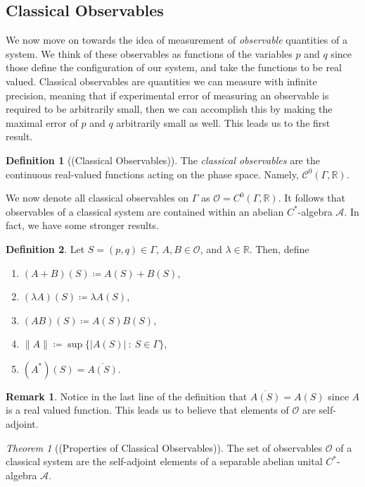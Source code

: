 \documentclass[leqno]{article}
\theoremstyle{definition}
\newtheorem{definition}{Definition}[section]
\newtheorem*{remark}{Remark}
\theoremstyle{remark}
\theoremstyle{theorem}
\newtheorem{theorem}{Theorem}[section]
\newcommand{\R}{\mathbb{R}}
\newcommand{\A}{\mathcal{A}}
\newcommand{\opO}{\mathcal{O}}
\begin{document}
\subsection{Classical Observables}
We now move on towards the idea of measurement of \emph{observable} quantities of a system. We think of these observables as functions of the variables $p$ and $q$ since those define the configuration of our system, and take the functions to be real valued.  Classical observables are quantities we can measure with infinite precision, meaning that if experimental error of measuring an observable is required to be arbitrarily small, then we can accomplish this by making the maximal error of $p$ and $q$ arbitrarily small as well.  This leads us to the first result.

\begin{definition}[(Classical Observables)]
The \emph{classical observables} are the continuous real-valued functions acting on the phase space.   Namely, $\mathcal{C}^0(\Gamma,\R)$.
\end{definition}

We now denote all classical observables on $\Gamma$ as $\opO=C^0(\Gamma,\R)$.  It follows that observables of a classical system are contained within an abelian $C^*$-algebra $\A$. In fact, we have some stronger results.

\begin{definition}
Let $S=(p,q)\in \Gamma$, $A,B\in \opO$, and $\lambda\in \R$. Then, define
\begin{enumerate}[1.]
\item $(A+B)(S)\coloneqq A(S)+B(S)$,
\item $(\lambda A)(S)\coloneqq \lambda A(S)$,
\item $(AB)(S)\coloneqq A(S)B(S)$,
\item $\|A\|\coloneqq \sup \{|A(S)| ~\colon~ S\in \Gamma\}$,
\item $(A^*)(S)=\overline{A(S)}$.
\end{enumerate}
\end{definition}

\begin{remark}
Notice in the last line of the definition that $\overline{A(S)}=A(S)$ since $A$ is a real valued function.  This leads us to believe that elements of $\opO$ are self-adjoint.
\end{remark}

\begin{theorem}[(Properties of Classical Observables)]
The set of observables $\opO$ of a classical system are the self-adjoint elements of a separable abelian unital $C^*$-algebra $\A$.
\end{theorem}
\end{document}
